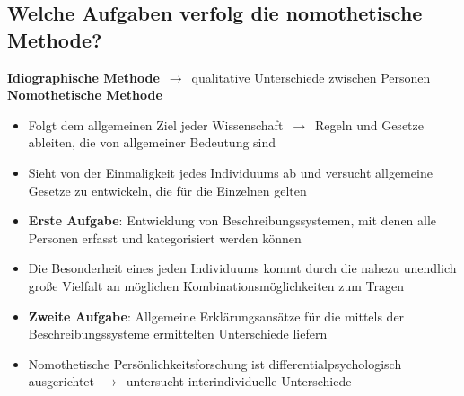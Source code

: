 \documentclass[a6paper,10pt,DIV=40]{scrartcl}
\begin{document}
\subsection{Welche Aufgaben verfolg die nomothetische Methode?}
    \textbf{Idiographische Methode} $\,\to\,$ qualitative Unterschiede zwischen Personen\\
    \textbf{Nomothetische Methode}
    \begin{itemize}\itemsep-0.5ex
        \item Folgt dem allgemeinen Ziel jeder Wissenschaft $\,\to\,$ Regeln und Gesetze ableiten, die von allgemeiner Bedeutung sind
        \item Sieht von der Einmaligkeit jedes Individuums ab und versucht allgemeine Gesetze zu entwickeln, die für die Einzelnen gelten
        \item \textbf{Erste Aufgabe}: Entwicklung von Beschreibungssystemen, mit denen alle Personen erfasst und kategorisiert werden können
        \item Die Besonderheit eines jeden Individuums kommt durch die nahezu unendlich große Vielfalt an möglichen Kombinationsmöglichkeiten zum Tragen
        \item \textbf{Zweite Aufgabe}: Allgemeine Erklärungsansätze für die mittels der Beschreibungssysteme ermittelten Unterschiede liefern
        \item Nomothetische Persönlichkeitsforschung ist differentialpsychologisch ausgerichtet $\,\to\,$ untersucht interindividuelle Unterschiede
    \end{itemize}
\end{document}
